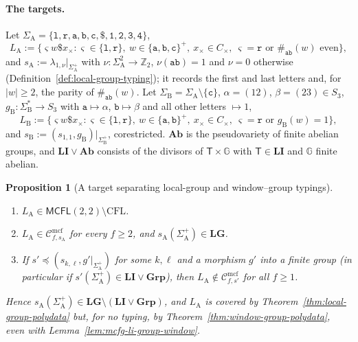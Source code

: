 \documentclass[11pt]{article}
\numberwithin{equation}{section}
\theoremstyle{plain}
\newtheorem{proposition}[theorem]{Proposition}
\theoremstyle{definition}
\theoremstyle{remark}
\newcommand{\Cmcf}[2]{\mathcal{C}^{\mathrm{mcf}}_{#1,#2}}
\begin{document}
\paragraph{The targets.}
Let $\Sigma_{\mathrm A}=\{\mathtt l,\mathtt r,\mathtt a,\mathtt b,\mathtt c,\mathtt\$,
\mathtt 1,\mathtt 2,\mathtt 3,\mathtt 4\}$,
\[
 L_{\mathrm A}:=\{\varsigma w\mathtt\$x_\times:\varsigma\in\{\mathtt l,\mathtt r\},\
 w\in\{\mathtt a,\mathtt b,\mathtt c\}^+,\ x_\times\in C_\times,\
 \varsigma=\mathtt r\text{ or }\#_{\mathtt{ab}}(w)\text{ even}\},
\]
and $s_{\mathrm A}:=\lambda_{1,\nu}|_{\Sigma_{\mathrm A}^+}$ with
$\nu:\Sigma_{\mathrm A}^2\to\mathbb Z_2$, $\nu(\mathtt{ab})=1$ and $\nu=0$ otherwise
(Definition~\ref{def:local-group-typing}); it records the first and last letters and,
for $|w|\ge2$, the parity of $\#_{\mathtt{ab}}(w)$.  Let
$\Sigma_{\mathrm B}=\Sigma_{\mathrm A}\setminus\{\mathtt c\}$, $\alpha=(12)$,
$\beta=(23)\in S_3$, $g_{\mathrm B}:\Sigma_{\mathrm B}^*\to S_3$ with
$\mathtt a\mapsto\alpha$, $\mathtt b\mapsto\beta$ and all other letters $\mapsto1$,
\[
 L_{\mathrm B}:=\{\varsigma w\mathtt\$x_\times:\varsigma\in\{\mathtt l,\mathtt r\},\
 w\in\{\mathtt a,\mathtt b\}^+,\ x_\times\in C_\times,\
 \varsigma=\mathtt r\text{ or }g_{\mathrm B}(w)=1\},
\]
and $s_{\mathrm B}:=(s_{1,1},g_{\mathrm B})|_{\Sigma_{\mathrm B}^+}$, corestricted.
$\mathbf{Ab}$ is the pseudovariety of finite abelian groups, and
$\mathbf{LI}\vee\mathbf{Ab}$ consists of the divisors of $\mathsf T\times {\mathbb G}$ with
$\mathsf T\in\mathbf{LI}$ and ${\mathbb G}$ finite abelian.

\begin{proposition}[A target separating local-group and window--group typings]
\label{prop:lg-needed-target}
\begin{enumerate}[label=\textup{(\roman*)},leftmargin=*]
\item $L_{\mathrm A}\in\mathsf{MCFL}(2,2)\setminus\mathrm{CFL}$.
\item $L_{\mathrm A}\in\Cmcf{f}{s_{\mathrm A}}$ for every $f\ge2$, and
$s_{\mathrm A}(\Sigma_{\mathrm A}^+)\in\mathbf{LG}$.
\item If $s'\preceq(s_{k,\ell},g'|_{\Sigma_{\mathrm A}^+})$ for some $k,\ell$ and a
morphism $g'$ into a finite group (in particular if
$s'(\Sigma_{\mathrm A}^+)\in\mathbf{LI}\vee\mathbf{Grp}$), then
$L_{\mathrm A}\notin\Cmcf{f}{s'}$ for all $f\ge1$.
\end{enumerate}
Hence $s_{\mathrm A}(\Sigma_{\mathrm A}^+)\in\mathbf{LG}\setminus(\mathbf{LI}\vee\mathbf{Grp})$,
and $L_{\mathrm A}$ is covered by Theorem~\ref{thm:local-group-polydata} but, for no
typing, by Theorem~\ref{thm:window-group-polydata}, even with
Lemma~\ref{lem:mcfg-li-group-window}.
\end{proposition}
\end{document}
